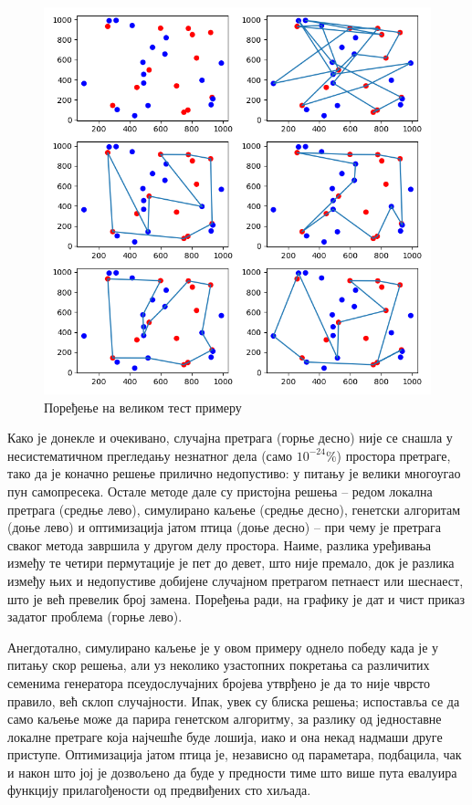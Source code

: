\documentclass[a4paper]{article}
\begin{document}
\begin{figure}[h!]
\begin{center}
\includegraphics[scale=0.6]{poredjenje30.png}
\end{center}
\caption{Поређење на великом тест примеру}
\label{poredjenje30}
\end{figure}

Како је донекле и очекивано, случајна претрага (горње десно) није се снашла у несистематичном прегледању незнатног дела (само $10^{-24}\%$) простора претраге, тако да је коначно решење прилично недопустиво: у питању је велики многоугао пун самопресека. Остале методе дале су пристојна решења -- редом локална претрага (средње лево), симулирано каљење (средње десно), генетски алгоритам (доње лево) и оптимизација јатом птица (доње десно) -- при чему је претрага сваког метода завршила у другом делу простора. Наиме, разлика уређивања између те четири пермутације је пет до девет, што није премало, док је разлика између њих и недопустиве добијене случајном претрагом петнаест или шеснаест, што је већ превелик број замена. Поређења ради, на графику је дат и чист приказ задатог проблема (горње лево).

Анегдотално, симулирано каљење је у овом примеру однело победу када је у питању скор решења, али уз неколико узастопних покретања са различитих семенима генератора псеудослучајних бројева утврђено је да то није чврсто правило, већ склоп случајности. Ипак, увек су блиска решења; испоставља се да само каљење може да парира генетском алгоритму, за разлику од једноставне локалне претраге која најчешће буде лошија, иако и она некад надмаши друге приступе. Оптимизација јатом птица је, независно од параметара, подбацила, чак и након што јој је дозвољено да буде у предности тиме што више пута евалуира функцију прилагођености од предвиђених сто хиљада.
\end{document}
